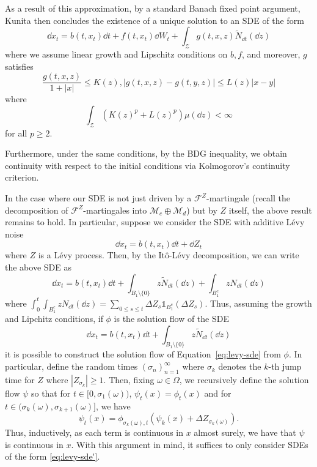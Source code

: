 \documentclass[]{article}
\theoremstyle{definition}
\theoremstyle{definition}
\begin{document}
As a result of this approximation, by a standard Banach fixed point argument, Kunita then concludes 
the existence of a unique solution to an SDE of the form 
\[\dd x_t = b(t, x_t)\dd t + f(t, x_t) \dd W_t + \int_\mathcal{Z} g(t, x, z) \tilde N_{\dd t}(\dd z)\]
where we assume linear growth and Lipschitz conditions on \(b, f\), and moreover, \(g\) satisfies 
\[\frac{g(t, x, z)}{1 + |x|} \le K(z), |g(t, x, z) - g(t, y, z)| \le L(z) |x - y|\]
where 
\begin{equation}\label{eq:growth-lp}
  \int_\mathcal{Z} (K(z)^p + L(z)^p) \mu(\dd z) < \infty
\end{equation}
for all \(p \ge 2\).

Furthermore, under the same conditions, by the BDG inequality, we obtain continuity with respect to the 
initial conditions via Kolmogorov's continuity criterion. 

In the case where our SDE is not just driven by a \(\mathcal{F}^Z\)-martingale (recall the decomposition 
of \(\mathcal{F}^Z\)-martingales into \(\mathcal{M}_c \oplus \mathcal{M}_d\)) but by \(Z\) itself, 
the above result remains to hold. In particular, suppose we consider the SDE with additive L\'evy noise
\begin{equation}\label{eq:levy-sde}
  \dd x_t = b(t, x_t) \dd t + \dd Z_t
\end{equation}
where \(Z\) is a L\'evy process. Then, by the It\^o-L\'evy decomposition, we can write the above 
SDE as
\[\dd x_t = b(t, x_t) \dd t + \int_{B_1 \setminus\{0\}} z \tilde N_{\dd t}(\dd z) + \int_{B_1^c} z N_{\dd t}(\dd z)\]
where \(\int_0^t \int_{B_1^c} z N_{\dd t}(\dd z) = \sum_{0 \le s \le t} \Delta Z_s \mathbb{1}_{B_1^c}(\Delta Z_s)\).
Thus, assuming the growth and Lipchitz conditions, if \(\phi\) is the solution flow of the SDE 
\begin{equation}\label{eq:levy-sde'}
  \dd x_t = b(t, x_t) \dd t + \int_{B_1 \setminus\{0\}} z \tilde N_{\dd t}(\dd z)
\end{equation}
it is possible to construct the solution flow of Equation~\eqref{eq:levy-sde} from \(\phi\). In particular, 
define the random times \((\sigma_n)_{n = 1}^\infty\) where \(\sigma_k\) denotes the \(k\)-th jump time 
for \(Z\) where \(|Z_{\sigma_k}| \ge 1\). Then, fixing \(\omega \in \Omega\), we recursively define the 
solution flow \(\psi\) so that for \(t \in [0, \sigma_1(\omega))\), \(\psi_t(x) = \phi_t(x)\) and for 
\(t \in (\sigma_k(\omega), \sigma_{k + 1}(\omega)]\), we have 
\[\psi_t(x) = \phi_{\sigma_k(\omega), t}(\psi_k(x) + \Delta Z_{\sigma_k(\omega)}).\]
Thus, inductively, as each term is continuous in \(x\) almost surely, we have that \(\psi\) is continuous 
in \(x\). With this argument in mind, it suffices to only consider SDEs of the form \eqref{eq:levy-sde'}.
\end{document}
